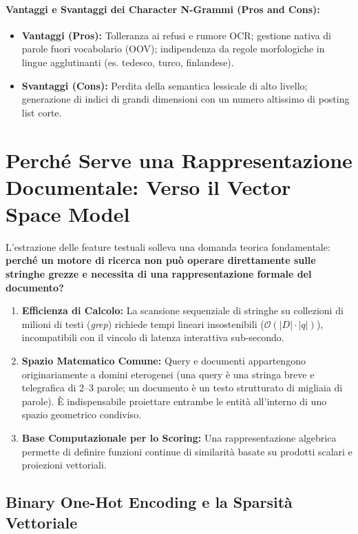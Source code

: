 \paragraph{Vantaggi e Svantaggi dei Character N-Grammi (Pros and Cons):}
\begin{itemize}
    \item \textbf{Vantaggi (Pros):} Tolleranza ai refusi e rumore OCR; gestione nativa di parole fuori vocabolario (OOV); indipendenza da regole morfologiche in lingue agglutinanti (es. tedesco, turco, finlandese).
    \item \textbf{Svantaggi (Cons):} Perdita della semantica lessicale di alto livello; generazione di indici di grandi dimensioni con un numero altissimo di posting list corte.
\end{itemize}

\FloatBarrier
\section{Perch\'e Serve una Rappresentazione Documentale: Verso il Vector Space Model}
\label{sec:perche-rappresentazione-vsm}

L'estrazione delle feature testuali solleva una domanda teorica fondamentale: \textbf{perch\'e un motore di ricerca non pu\`o operare direttamente sulle stringhe grezze e necessita di una rappresentazione formale del documento?}
\begin{enumerate}
    \item \textbf{Efficienza di Calcolo:} La scansione sequenziale di stringhe su collezioni di milioni di testi (\textit{grep}) richiede tempi lineari insostenibili ($\mathcal{O}(|D| \cdot |q|)$), incompatibili con il vincolo di latenza interattiva sub-secondo.
    \item \textbf{Spazio Matematico Comune:} Query e documenti appartengono originariamente a domini eterogenei (una query \`e una stringa breve e telegrafica di 2--3 parole; un documento \`e un testo strutturato di migliaia di parole). È indispensabile proiettare entrambe le entit\`a all'interno di uno spazio geometrico condiviso.
    \item \textbf{Base Computazionale per lo Scoring:} Una rappresentazione algebrica permette di definire funzioni continue di similarit\`a basate su prodotti scalari e proiezioni vettoriali.
\end{enumerate}

\FloatBarrier
\subsection{Binary One-Hot Encoding e la Sparsit\`a Vettoriale}
\label{subsec:one-hot-encoding}

